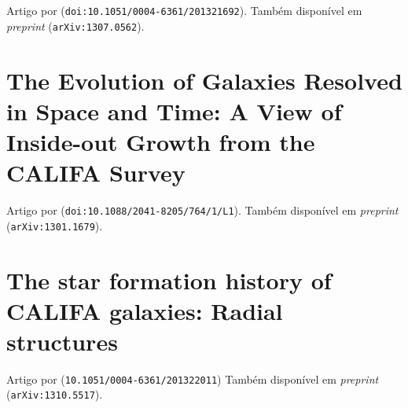 Artigo por \cite{CidFernandes2014} (\texttt{doi:10.1051/0004-6361/201321692}).
Também disponível em {\em preprint} (\texttt{arXiv:1307.0562}).

\cleardoublepage





\section{The Evolution of Galaxies Resolved in Space and Time: A View of
Inside-out Growth from the CALIFA Survey}
\label{apendice:InsideOut}

Artigo por \cite{Perez2013} (\texttt{doi:10.1088/2041-8205/764/1/L1}).
Também disponível em {\em preprint} (\texttt{arXiv:1301.1679}).

\cleardoublepage





\section{The star formation history of CALIFA galaxies: Radial structures}
\label{apendice:RadStruct}

Artigo por \cite{GonzalezDelgado2014a} (\texttt{10.1051/0004-6361/201322011})
Também disponível em {\em preprint} (\texttt{arXiv:1310.5517}).

\cleardoublepage




